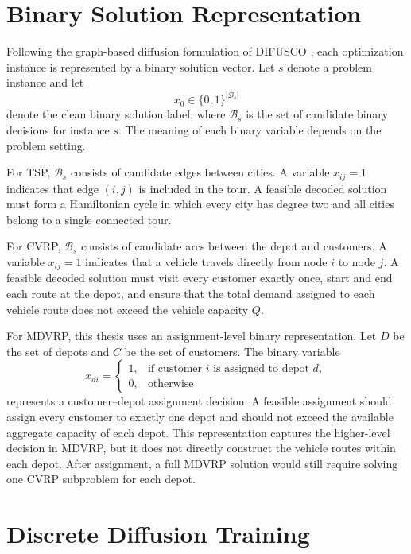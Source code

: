 \section{Binary Solution Representation}
\label{sec:binary-solution-representation}

Following the graph-based diffusion formulation of DIFUSCO \citep{sun2023difusco}, each optimization instance is represented by a binary solution vector. Let \(s\) denote a problem instance and let
\[
    x_0 \in \{0,1\}^{|\mathcal{B}_s|}
\]
denote the clean binary solution label, where \(\mathcal{B}_s\) is the set of candidate binary decisions for instance \(s\). The meaning of each binary variable depends on the problem setting.

For TSP, \(\mathcal{B}_s\) consists of candidate edges between cities. A variable \(x_{ij}=1\) indicates that edge \((i,j)\) is included in the tour. A feasible decoded solution must form a Hamiltonian cycle in which every city has degree two and all cities belong to a single connected tour.

For CVRP, \(\mathcal{B}_s\) consists of candidate arcs between the depot and customers. A variable \(x_{ij}=1\) indicates that a vehicle travels directly from node \(i\) to node \(j\). A feasible decoded solution must visit every customer exactly once, start and end each route at the depot, and ensure that the total demand assigned to each vehicle route does not exceed the vehicle capacity \(Q\).

For MDVRP, this thesis uses an assignment-level binary representation. Let \(D\) be the set of depots and \(C\) be the set of customers. The binary variable
\[
    x_{di} =
    \begin{cases}
    1, & \text{if customer } i \text{ is assigned to depot } d,\\
    0, & \text{otherwise}
    \end{cases}
\]
represents a customer--depot assignment decision. A feasible assignment should assign every customer to exactly one depot and should not exceed the available aggregate capacity of each depot. This representation captures the higher-level decision in MDVRP, but it does not directly construct the vehicle routes within each depot. After assignment, a full MDVRP solution would still require solving one CVRP subproblem for each depot.

\section{Discrete Diffusion Training}
\label{sec:discrete-diffusion-training}

